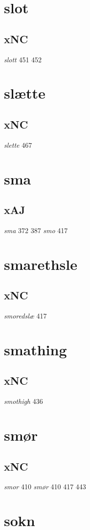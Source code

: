\documentclass[a4paper,twocolumn]{article}
\begin{document}
\section{slot}
\label{sec:orgff8fa30}
\subsection{xNC}
\label{sec:org9602ffe}
\emph{slott} 451 452 
\section{slætte}
\label{sec:orgde9d9e5}
\subsection{xNC}
\label{sec:orgee87021}
\emph{slette} 467 
\section{sma}
\label{sec:org9a3475e}
\subsection{xAJ}
\label{sec:orgc880373}
\emph{sma} 372 387 \emph{smo} 417 
\section{smarethsle}
\label{sec:org1432bc3}
\subsection{xNC}
\label{sec:org8f3791c}
\emph{smoredslæ} 417 
\section{smathing}
\label{sec:orge48c8ed}
\subsection{xNC}
\label{sec:org25c2d6b}
\emph{smothigh} 436 
\section{smør}
\label{sec:org6d5a572}
\subsection{xNC}
\label{sec:orgcc6ecb4}
\emph{smor} 410 \emph{smør} 410 417 443 
\section{sokn}
\label{sec:org8565803}
\end{document}
